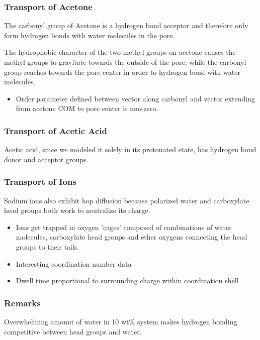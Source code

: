 \documentclass{article}
\begin{document}
  \subsubsection*{Transport of Acetone}

  The carbonyl group of Acetone is a hydrogen bond acceptor and therefore only
  form hydrogen bonds with water molecules in the pore. 

  The hydrophobic character of the two methyl groups on acetone causes the methyl
  groups to gravitate towards the outside of the pore, while the carbonyl group
  reaches towards the pore center in order to hydrogen bond with water molecules.
  \begin{itemize}
	\item Order parameter defined between vector along carbonyl and vector extending
	from acetone COM to pore center is non-zero.
  \end{itemize} 

  \subsubsection*{Transport of Acetic Acid}

  Acetic acid, since we modeled it solely in its protonated state, has hydrogen
  bond donor and acceptor groups. 

  \subsubsection*{Transport of Ions} %

  Sodium ions also exhibit hop diffusion because polarized water and
  carboxylate head groups both work to neutralize its charge.
  \begin{itemize}
	\item Ions get trapped in oxygen 'cages' composed of combinations
	of water molecules, carboxylate head groups and ether oxygens connecting
	the head groups to their tails.
  	\item Interesting coordination number data
	\item Dwell time proportional to surrounding charge within coordination shell
  \end{itemize}

  \subsubsection*{Remarks}
   
  Overwhelming amount of water in 10 wt\% system makes hydrogen bonding
  competitive between head groups and water.
\end{document}
